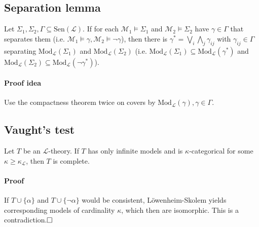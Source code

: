 \documentclass{scrartcl}
\begin{document}
\subsection{Separation lemma}
Let $\Sigma_1, \Sigma_2, \Gamma \subseteq \mathrm{Sen}(\mathcal{L})$. If for each $\mathcal{M}_1 \models \Sigma_1$ and $\mathcal{M}_2 \models \Sigma_2$ have $\gamma \in \Gamma$ that separates them (i.e. $\mathcal{M}_1 \models \gamma, \mathcal{M}_2 \models \neg\gamma$), then there is $\gamma^* = \bigvee_i \bigwedge_j \gamma_{ij}$ with $\gamma_{ij} \in \Gamma$ separating $\mathrm{Mod}_{\mathcal{L}}(\Sigma_1)$ and $\mathrm{Mod}_{\mathcal{L}}(\Sigma_2)$ (i.e. $\mathrm{Mod}_{\mathcal{L}}(\Sigma_1) \subseteq \mathrm{Mod}_{\mathcal{L}}(\gamma^*)$ and $\mathrm{Mod}_{\mathcal{L}}(\Sigma_2) \subseteq \mathrm{Mod}_{\mathcal{L}}(\neg\gamma^*)$).
\paragraph{Proof idea} Use the compactness theorem twice on covers by $\mathrm{Mod}_{\mathcal{L}}(\gamma), \gamma \in \Gamma$.

\subsection{Vaught's test}
Let $T$ be an $\mathcal{L}$-theory. If $T$ has only infinite models and is $\kappa$-categorical for some $\kappa \geq \kappa_{\mathcal{L}}$, then $T$ is complete.
\paragraph{Proof} If $T \cup \{\alpha\}$ and $T \cup \{\neg \alpha\}$ would be consistent, Löwenheim-Skolem yields corresponding models of cardinality $\kappa$, which then are isomorphic. This is a contradiction.$\hfill\square$
\end{document}
